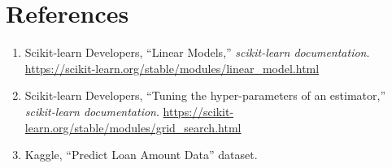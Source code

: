\documentclass[12pt,a4paper]{article}
\begin{document}
\section{References}
\begin{enumerate}
\item Scikit-learn Developers, ``Linear Models,'' \textit{scikit-learn documentation}.
\url{https://scikit-learn.org/stable/modules/linear_model.html}
\item Scikit-learn Developers, ``Tuning the hyper-parameters of an estimator,'' \textit{scikit-learn documentation}.
\url{https://scikit-learn.org/stable/modules/grid_search.html}
\item Kaggle, ``Predict Loan Amount Data'' dataset.
\end{enumerate}
\end{document}
